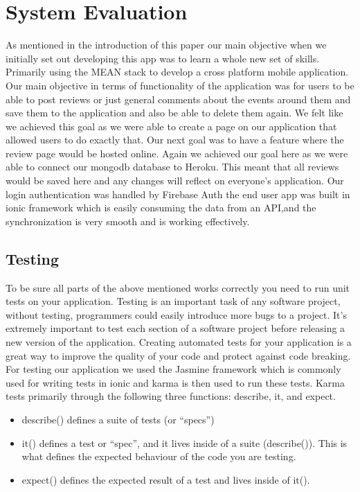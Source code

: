 \chapter{System Evaluation}
As mentioned in the introduction of this paper our main objective when we initially set out developing this app was to learn a whole new set of skills. Primarily using the MEAN stack to develop a cross platform mobile application. Our main objective in terms of functionality of the application was for users to be able to post reviews or just general comments about the events around them and save them to the application and also be able to delete them again. We felt like we achieved this goal as we were able to create a page on our application that allowed users to do exactly that. Our next goal was to have a feature where the review page would be hosted online. Again we achieved our goal here as we were able to connect our mongodb database to Heroku. This meant that all reviews would be saved here and any changes will reflect on everyone's application. Our login authentication was handled by Firebase Auth the
end user app was built in ionic framework which is easily consuming the data from an
API,and the synchronization is very smooth and is working effectively.

\section{Testing}
To be sure all parts of the above mentioned works correctly you need to run unit tests on your application. Testing is an important task of any software project, without testing, programmers could easily introduce more bugs to a project. It's extremely important to test each section of a software project before releasing a new version of the application. Creating automated tests for your application is a great way to improve the quality of your code and protect against code breaking.
For testing our application we used the Jasmine framework which is commonly used for writing tests in ionic and karma is then used to run these tests.\cite{karma}\cite{jasmine} Karma tests primarily through the following three functions: describe, it, and expect. 
\begin{itemize}
\item describe() defines a suite of tests (or “specs”)

\item it() defines a test or “spec”, and it lives inside of a suite (describe()). This is what defines the expected behaviour of the code you are testing.

\item expect() defines the expected result of a test and lives inside of it().
\end{itemize}

